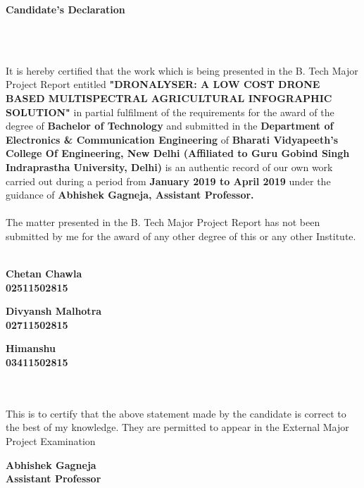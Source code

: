 \newpage
\begin{center}
\thispagestyle{empty}
\LARGE{\textbf{Candidate's Declaration}}\\[1cm]
\end{center}
\linespread{1.13}
\\
\\
\large{It is hereby certified that the work which is being presented in the B. Tech Major Project Report entitled \textbf{"DRONALYSER: A LOW COST DRONE BASED MULTISPECTRAL AGRICULTURAL INFOGRAPHIC SOLUTION"} in partial fulfilment of the requirements for the award of the degree of \textbf{Bachelor of Technology} and submitted in the \textbf{Department of Electronics \& Communication Engineering} of \textbf{Bharati Vidyapeeth's College Of Engineering, New Delhi (Affiliated to Guru Gobind Singh Indraprastha University, Delhi)} is an authentic record of our own work carried out during a period from \textbf{January 2019 to April 2019} under the guidance of \textbf{Abhishek Gagneja, Assistant Professor.}
\\
\\
The matter presented in the B. Tech Major Project Report has not been submitted by me for the award of any other degree of this or any other Institute. 
\vspace{0.8in}
\\
\\
\begin{minipage}{0.35\linewidth}
\begin{center}
\textbf{Chetan Chawla\\
02511502815}
\end{center}
\end{minipage}
\begin{minipage}{0.30\linewidth}
\begin{center}
\textbf{Divyansh Malhotra\\
02711502815}    
\end{center}
\end{minipage}
\begin{minipage}{0.30\linewidth}
\begin{center}
\textbf{Himanshu\\
03411502815}    
\end{center}
\end{minipage}
\vspace{0.2in}
\\
\\
This is to certify that the above statement made by the candidate is correct to the best of my knowledge. They are permitted to appear in the External Major Project Examination
\vspace{1in}
\\

\begin{flushright}
\textbf{Abhishek Gagneja\\
Assistant Professor}
\end{flushright}
}
